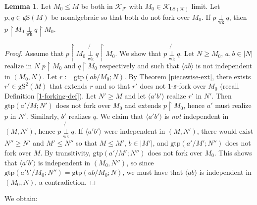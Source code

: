 \documentclass[12pt]{amsart}
\theoremstyle{definition}
\newtheorem{lem}[mydef]{Lemma}
\begin{document}
\begin{lem}\label{perp-nf-2}
  Let $M_0 {\le} M$ be both in ${\mathcal{K}}_{\mathcal{F}}$ with $M_0 \in {\mathcal{K}}_{{\text{LS}} ({\mathcal{K}})}$ limit. Let $p, q \in {\text{gS}} (M)$ be nonalgebraic so that both do not fork over $M_0$. If $p {{{{\underset{{{\text{wk}}}}{\overset{{{{}}}}{{\perp}}}}}}} q$, then $p {\upharpoonright} M_0 {{{{\underset{{{\text{wk}}}}{\overset{{{{}}}}{{\perp}}}}}}} q {\upharpoonright} M_0$.
\end{lem}
\begin{proof}
  Assume that $p {\upharpoonright} M_0 \not {{{{\underset{{{\text{wk}}}}{\overset{{{{}}}}{{\perp}}}}}}} q {\upharpoonright} M_0$. We show that $p \not {{{{\underset{{{\text{wk}}}}{\overset{{{{}}}}{{\perp}}}}}}} q$. Let $N {\ge} M_0$, $a, b \in |N|$ realize in $N$ $p {\upharpoonright} M_0$ and $q {\upharpoonright} M_0$ respectively and such that ${\langle {ab} \rangle}$ is not independent in $(M_0, N)$. Let $r := {\text{gtp}} (ab / M_0; N)$. By Theorem \ref{piecewise-ext}, there exists $r' \in {\text{gS}}^2 (M)$ that extends $r$ and so that $r'$ does not $1$-${\mathfrak{s}}$-fork over $M_0$ (recall Definition \ref{1-forking-def}). Let $N' {\ge} M$ and let ${\langle {a'b'} \rangle}$ realize $r'$ in $N'$. Then ${\text{gtp}} (a' / M; N')$ does not fork over $M_0$ and extends $p {\upharpoonright} M_0$, hence $a'$ must realize $p$ in $N'$. Similarly, $b'$ realizes $q$. We claim that ${\langle {a'b'} \rangle}$ is \emph{not} independent in $(M, N')$, hence $p \not {{{{\underset{{{\text{wk}}}}{\overset{{{{}}}}{{\perp}}}}}}} q$. If ${\langle {a'b'} \rangle}$ were independent in $(M, N')$, there would exist $N'' {\ge} N'$ and $M' {\le} N''$ so that $M {\le} M'$, $b \in |M'|$, and ${\text{gtp}} (a' / M'; N'')$ does not fork over $M$. By transitivity, ${\text{gtp}} (a' / M'; N'')$ does not fork over $M_0$. This shows that ${\langle {a' b'} \rangle}$ is independent in $(M_0, N'')$, so since ${\text{gtp}} (a' b' / M_0; N'') = {\text{gtp}} (a b / M_0; N)$, we must have that ${\langle {ab} \rangle}$ is independent in $(M_0, N)$, a contradiction.
\end{proof}

We obtain:
\end{document}
